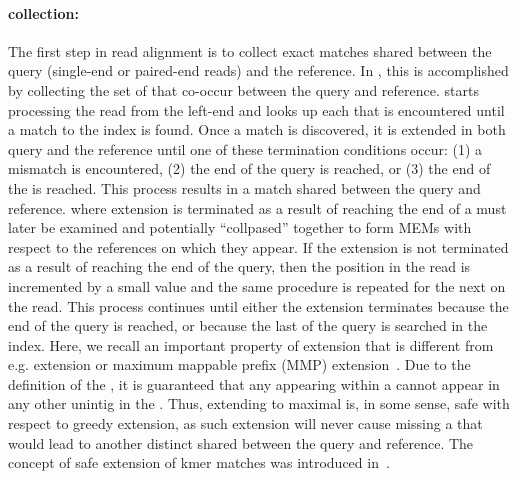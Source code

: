 \paragraph{\Unimem collection:}
The first step in read alignment is to collect exact matches shared
between the query (single-end or paired-end reads) and the reference.
In \puffaligner, this is accomplished by collecting the set of
\unimems that co-occur between the query and reference. \puffaligner
starts processing the read from the left-end and
looks up each \kmer that is encountered until a match to the index is
found. Once a match is discovered, it is extended in both query and the reference 
until one of these termination conditions occur: (1) a mismatch is encountered, 
(2) the end of the query is reached, or (3) the end of the
\unitig is reached. This process results in a \unimem match shared
between the query and reference. \Unimems where extension is terminated
as a result of reaching the end of a \unitig must later be 
examined and potentially ``collpased'' together to form MEMs with respect
to the references on which they appear. If the \unimem extension is not
terminated as a result of reaching the end of the query, then the
position in the read is incremented by a small value and the same procedure is repeated
for the next \kmer on the read. This process continues until either
the \unimem extension terminates because the end of the query is
reached, or because the last \kmer of the query is searched in the index.
Here, we recall an important property of \unimem extension that is
different from e.g. \mem extension or maximum mappable prefix (MMP)
extension~\citep{Dobin2013Star}. Due to the definition of the \ccdbgshort, it
is guaranteed that any \kmer appearing within a \unimem cannot appear
in any other unintig in the \ccdbgshort. Thus, extending \kmers to
maximal \unimems is, in some sense, safe with respect to greedy
extension, as such extension will never cause missing a \kmer that
would lead to another distinct \unimem shared between the query and
reference. The concept of safe extension of kmer matches was introduced in~\citep{selaln}.

